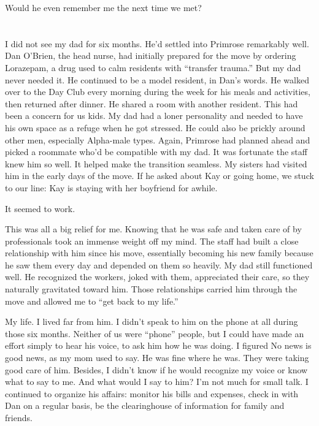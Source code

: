 \documentclass[12pt]{book}
\begin{document}
Would he even remember me the next time we met? 

\part{}
\chapter{}

I did not see my dad for six months. He'd settled into Primrose remarkably well. Dan O'Brien, the head nurse, had initially prepared for the move by ordering Lorazepam, a drug used to calm residents with ``transfer trauma.'' But my dad never needed it. He continued to be a model resident, in Dan's words. He walked over to the Day Club every morning during the week for his meals and activities, then returned after dinner. He shared a room with another resident. This had been a concern for us kids. My dad had a loner personality and needed to have his own space as a refuge when he got stressed. He could also be prickly around other men, especially Alpha-male types. Again, Primrose had planned ahead and picked a roommate who'd be compatible with my dad. It was fortunate the staff knew him so well. It helped make the transition seamless. My sisters had visited him in the early days of the move. If he asked about Kay or going home, we stuck to our line: Kay is staying with her boyfriend for awhile.

It seemed to work.

This was all a big relief for me. Knowing that he was safe and taken care of by professionals took an immense weight off my mind. The staff had built a close relationship with him since his move, essentially becoming his new family because he saw them every day and depended on them so heavily. My dad still functioned well. He recognized the workers, joked with them, appreciated their care, so they naturally gravitated toward him. Those relationships carried him through the move and allowed me to ``get back to my life.''

My life. I lived far from him. I didn't speak to him on the phone at all during those six months. Neither of us were ``phone'' people, but I could have made an effort simply to hear his voice, to ask him how he was doing. I figured No news is good news, as my mom used to say. He was fine where he was. They were taking good care of him. Besides, I didn't know if he would recognize my voice or know what to say to me. And what would I say to him? I'm not much for small talk. I continued to organize his affairs: monitor his bills and expenses, check in with Dan on a regular basis, be the clearinghouse of information for family and friends.
\end{document}

